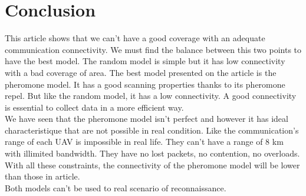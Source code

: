 \part{Conclusion}

This article shows that we can't have a good coverage with an adequate communication connectivity. We must find the balance between this two points to have the best model. The random model is simple but it has low connectivity with a bad coverage of area. The best model presented on the article is the pheromone model. It has a good scanning properties thanks to its pheromone repel. But like the random model, it has a low connectivity. A good connectivity is essential to collect data in a more efficient way.\\

We have seen that the pheromone model isn't perfect and however it has ideal characteristique that are not possible in real condition. Like the communication's range of each UAV is impossible in real life. They can't have a range of 8 km with illimited bandwidth. They have no lost packets,  no contention, no overloads. With all these constraints, the connectivity of the pheromone model will be lower than those in article.\\
Both models can't be used to real scenario of reconnaissance.